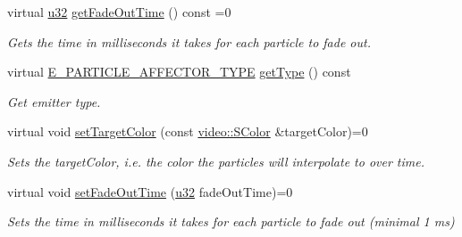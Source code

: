 \begin{DoxyCompactItemize}
virtual \hyperlink{namespaceirr_a0416a53257075833e7002efd0a18e804}{u32} \hyperlink{classirr_1_1scene_1_1IParticleFadeOutAffector_a4c4195b7878fd93526506e1c592bdbec}{get\+Fade\+Out\+Time} () const =0
\begin{DoxyCompactList}\small\item\em Gets the time in milliseconds it takes for each particle to fade out. \end{DoxyCompactList}\item 
\mbox{\label{classirr_1_1scene_1_1IParticleFadeOutAffector_aaf584388aa7065bbfdb571253ba34b61}} 
virtual \hyperlink{namespaceirr_1_1scene_a34c0f9475cfcbda8b50ad816a046010b}{E\+\_\+\+P\+A\+R\+T\+I\+C\+L\+E\+\_\+\+A\+F\+F\+E\+C\+T\+O\+R\+\_\+\+T\+Y\+PE} \hyperlink{classirr_1_1scene_1_1IParticleFadeOutAffector_aaf584388aa7065bbfdb571253ba34b61}{get\+Type} () const
\begin{DoxyCompactList}\small\item\em Get emitter type. \end{DoxyCompactList}\item 
\mbox{\label{classirr_1_1scene_1_1IParticleFadeOutAffector_a600712e14e4a4a55da773cdc6f39cdf4}} 
virtual void \hyperlink{classirr_1_1scene_1_1IParticleFadeOutAffector_a600712e14e4a4a55da773cdc6f39cdf4}{set\+Target\+Color} (const \hyperlink{classirr_1_1video_1_1SColor}{video\+::\+S\+Color} \&target\+Color)=0
\begin{DoxyCompactList}\small\item\em Sets the target\+Color, i.\+e. the color the particles will interpolate to over time. \end{DoxyCompactList}\item 
\mbox{\label{classirr_1_1scene_1_1IParticleFadeOutAffector_a838758aef6c351a26c4d3190dc1b7645}} 
virtual void \hyperlink{classirr_1_1scene_1_1IParticleFadeOutAffector_a838758aef6c351a26c4d3190dc1b7645}{set\+Fade\+Out\+Time} (\hyperlink{namespaceirr_a0416a53257075833e7002efd0a18e804}{u32} fade\+Out\+Time)=0
\begin{DoxyCompactList}\small\item\em Sets the time in milliseconds it takes for each particle to fade out (minimal 1 ms) \end{DoxyCompactList}\item 

\end{DoxyCompactItemize}
